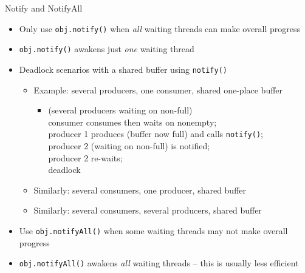 \documentclass{concdistfoils}
\def\heading#1{\begin{cframed}[8.8in]{#1}\end{cframed}}
\begin{document}
\begin{slide}
\heading{Notify and NotifyAll}
\vfill
\begin{itemize}
\item Only use \texttt{obj.notify()} when \textit{all} waiting threads can make overall progress
\item \texttt{obj.notify()} awakens just \textit{one} waiting thread
\vfill
\item Deadlock scenarios with a shared buffer using \texttt{notify()}
\begin{itemize}
\item Example: several producers, one consumer, shared one-place buffer
\begin{itemize}
\item[] 
      (several producers waiting on non-full)\\
      consumer consumes then waits on nonempty;\\ 
      producer 1 produces (buffer now full) and calls \texttt{notify()}; \\
      producer 2 (waiting on non-full) is notified; \\
      producer 2 re-waits; \\
      deadlock
\end{itemize}
\item Similarly: several consumers, one producer, shared buffer
\item Similarly: several consumers, several producers, shared buffer
\end{itemize}
\vfill
\item Use \texttt{obj.notifyAll()} when some waiting threads may not make overall progress
\item \texttt{obj.notifyAll()} awakens \textit{all} waiting threads
 -- this is usually less efficient
\end{itemize}
\end{slide}
\end{document}
